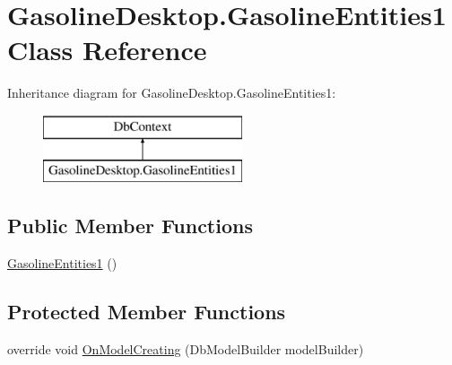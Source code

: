 \hypertarget{class_gasoline_desktop_1_1_gasoline_entities1}{}\section{Gasoline\+Desktop.\+Gasoline\+Entities1 Class Reference}
\label{class_gasoline_desktop_1_1_gasoline_entities1}
Inheritance diagram for Gasoline\+Desktop.\+Gasoline\+Entities1\+:\begin{figure}[H]
\begin{center}
\leavevmode
\includegraphics[height=2.000000cm]{class_gasoline_desktop_1_1_gasoline_entities1}
\end{center}
\end{figure}
\subsection*{Public Member Functions}
\begin{DoxyCompactItemize}
\item 
\mbox{\hyperlink{class_gasoline_desktop_1_1_gasoline_entities1_a3c61819e52e5b6bb466b44324b1cfbc6}{Gasoline\+Entities1}} ()
\end{DoxyCompactItemize}
\subsection*{Protected Member Functions}
\begin{DoxyCompactItemize}
\item 
override void \mbox{\hyperlink{class_gasoline_desktop_1_1_gasoline_entities1_a5e4b81981a34e2dcb2bd0d33ed5a6849}{On\+Model\+Creating}} (Db\+Model\+Builder model\+Builder)
\end{DoxyCompactItemize}
